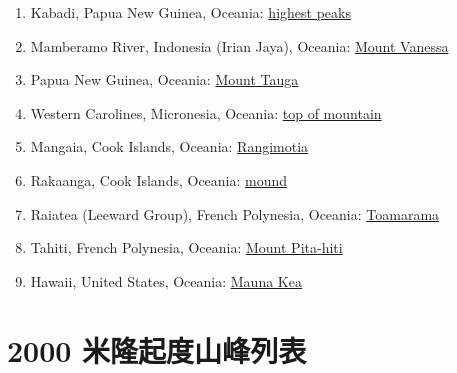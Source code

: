 \documentclass[10pt,twocolumn,letterpaper]{article}
\begin{document}
\begin{flushleft}
\begin{enumerate}
\item Kabadi, Papua New Guinea, Oceania: \href{http://www.talkorigins.org/faqs/flood-myths.html#Kabadi}{highest peaks}
\item Mamberamo River, Indonesia (Irian Jaya), Oceania: \href{http://www.talkorigins.org/faqs/flood-myths.html#MamberaoRiver}{Mount Vanessa}
\item Papua New Guinea, Oceania: \href{http://www.talkorigins.org/faqs/flood-myths.html#PapuaNewGuinea}{Mount Tauga}
\item Western Carolines, Micronesia, Oceania: \href{http://www.talkorigins.org/faqs/flood-myths.html#westCarolines}{top of mountain}
\item Mangaia, Cook Islands, Oceania: \href{http://www.talkorigins.org/faqs/flood-myths.html#Mangaia}{Rangimotia}
\item Rakaanga, Cook Islands, Oceania: \href{http://www.talkorigins.org/faqs/flood-myths.html#Rakaanga}{mound}
\item Raiatea (Leeward Group), French Polynesia, Oceania: \href{http://www.talkorigins.org/faqs/flood-myths.html#Raiatea}{Toamarama}
\item Tahiti, French Polynesia, Oceania: \href{http://www.talkorigins.org/faqs/flood-myths.html#Tahiti}{Mount Pita-hiti}
\item Hawaii, United States, Oceania: \href{http://www.talkorigins.org/faqs/flood-myths.html#Hawaii}{Mauna Kea}
\end{enumerate}
\end{flushleft}

\clearpage
\twocolumn

\section{2000 米隆起度山峰列表}
\end{document}
